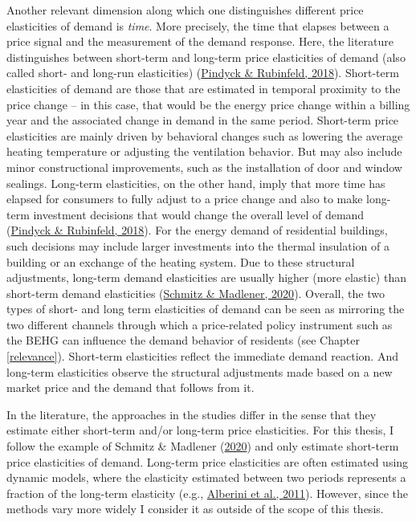 \documentclass[12pt,twoside]{reedthesis}
\begin{document}
Another relevant dimension along which one distinguishes different price elasticities of demand is \emph{time}. More precisely, the time that elapses between a price signal and the measurement of the demand response. Here, the literature distinguishes between short-term and long-term price elasticities of demand (also called short- and long-run elasticities) (\protect\hyperlink{ref-pindyck_rubinfeld18}{Pindyck \& Rubinfeld, 2018}). Short-term elasticities of demand are those that are estimated in temporal proximity to the price change -- in this case, that would be the energy price change within a billing year and the associated change in demand in the same period. Short-term price elasticities are mainly driven by behavioral changes such as lowering the average heating temperature or adjusting the ventilation behavior. But may also include minor constructional improvements, such as the installation of door and window sealings. Long-term elasticities, on the other hand, imply that more time has elapsed for consumers to fully adjust to a price change and also to make long-term investment decisions that would change the overall level of demand (\protect\hyperlink{ref-pindyck_rubinfeld18}{Pindyck \& Rubinfeld, 2018}). For the energy demand of residential buildings, such decisions may include larger investments into the thermal insulation of a building or an exchange of the heating system. Due to these structural adjustments, long-term demand elasticities are usually higher (more elastic) than short-term demand elasticities (\protect\hyperlink{ref-schmitz_madlener20}{Schmitz \& Madlener, 2020}). Overall, the two types of short- and long term elasticities of demand can be seen as mirroring the two different channels through which a price-related policy instrument such as the BEHG can influence the demand behavior of residents (see Chapter \ref{relevance}). Short-term elasticities reflect the immediate demand reaction. And long-term elasticities observe the structural adjustments made based on a new market price and the demand that follows from it.

In the literature, the approaches in the studies differ in the sense that they estimate either short-term and/or long-term price elasticities. For this thesis, I follow the example of Schmitz \& Madlener (\protect\hyperlink{ref-schmitz_madlener20}{2020}) and only estimate short-term price elasticities of demand. Long-term price elasticities are often estimated using dynamic models, where the elasticity estimated between two periods represents a fraction of the long-term elasticity (e.g., \protect\hyperlink{ref-alberini_etal11}{Alberini et al., 2011}). However, since the methods vary more widely I consider it as outside of the scope of this thesis.
\end{document}
